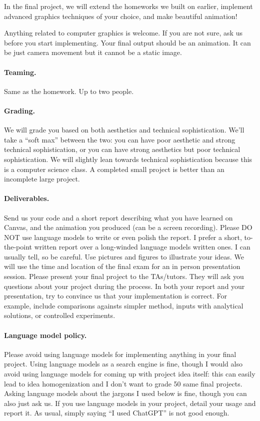 




In the final project, we will extend the homeworks we built on earlier, implement advanced graphics techniques of your choice, and make beautiful animation!

Anything related to computer graphics is welcome. If you are not sure, ask us before you start implementing. Your final output should be an animation. It can be just camera movement but it cannot be a static image.

\paragraph{Teaming.} Same as the homework. Up to two people.

\paragraph{Grading.} We will grade you based on both aesthetics and technical sophistication. We'll take a ``soft max'' between the two: you can have poor aesthetic and strong technical sophistication, or you can have strong aesthetics but poor technical sophistication. We will slightly lean towards technical sophistication because this is a computer science class. A completed small project is better than an incomplete large project. 

\paragraph{Deliverables.} Send us your code and a short report describing what you have learned on Canvas, and the animation you produced (can be a screen recording). Please DO NOT use language models to write or even polish the report. I prefer a short, to-the-point written report over a long-winded language models written ones. I can usually tell, so be careful. Use pictures and figures to illustrate your ideas.
We will use the time and location of the final exam for an in person presentation session. Please present your final project to the TAs/tutors. They will ask you questions about your project during the process.
In both your report and your presentation, try to convince us that your implementation is correct. For example, include comparisons againsts simpler method, inputs with analytical solutions, or controlled experiments.

\paragraph{Language model policy.} Please avoid using language models for implementing anything in your final project. Using language models as a search engine is fine, though I would also avoid using language models for coming up with project idea itself: this can easily lead to idea homogenization and I don't want to grade 50 same final projects. Asking language models about the jargons I used below is fine, though you can also just ask us.
If you use language models in your project, detail your usage and report it. As usual, simply saying ``I used ChatGPT'' is not good enough.

